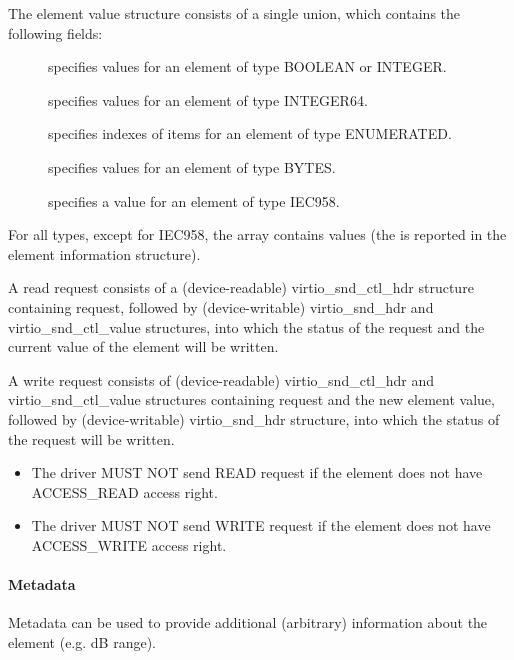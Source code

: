 The element value structure consists of a single  union, which
contains the following fields:

\begin{description}
\item[] specifies values for an element of type BOOLEAN or
INTEGER.
\item[] specifies values for an element of type INTEGER64.
\item[] specifies indexes of items for an element of type
ENUMERATED.
\item[] specifies values for an element of type BYTES.
\item[] specifies a value for an element of type IEC958.
\end{description}

For all types, except for IEC958, the array contains  values
(the  is reported in the element information structure).

A read request consists of a (device-readable) virtio_snd_ctl_hdr structure
containing request, followed by (device-writable) virtio_snd_hdr and
virtio_snd_ctl_value structures, into which the status of the request and
the current value of the element will be written.

A write request consists of (device-readable) virtio_snd_ctl_hdr and
virtio_snd_ctl_value structures containing request and the new element value,
followed by (device-writable) virtio_snd_hdr structure, into which the status
of the request will be written.


\begin{itemize}
\item The driver MUST NOT send READ request if the element does not have ACCESS_READ access right.
\item The driver MUST NOT send WRITE request if the element does not have ACCESS_WRITE access right.
\end{itemize}

\paragraph{Metadata}

Metadata can be used to provide additional (arbitrary) information about the
element (e.g. dB range).

